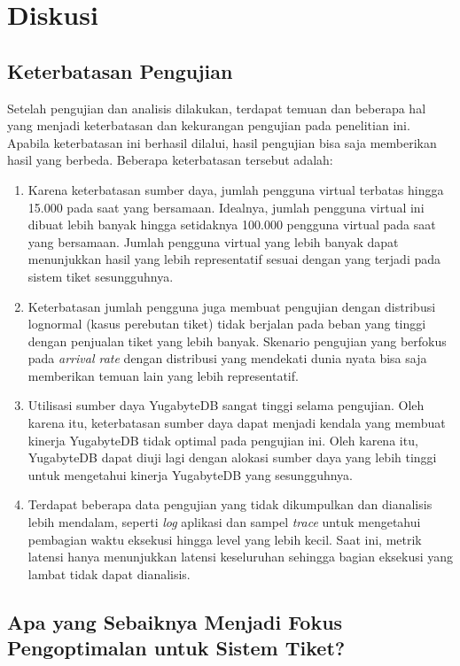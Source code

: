 \section{Diskusi}

\subsection{Keterbatasan Pengujian}
\label{keterbatasan-pengujian}

Setelah pengujian dan analisis dilakukan, terdapat temuan dan beberapa hal yang menjadi keterbatasan dan kekurangan pengujian pada penelitian ini. Apabila keterbatasan ini berhasil dilalui, hasil pengujian bisa saja memberikan hasil yang berbeda. Beberapa keterbatasan tersebut adalah:

\begin{enumerate}
    \item Karena keterbatasan sumber daya, jumlah pengguna virtual terbatas hingga 15.000 pada saat yang bersamaan. Idealnya, jumlah pengguna virtual ini dibuat lebih banyak hingga setidaknya 100.000 pengguna virtual pada saat yang bersamaan. Jumlah pengguna virtual yang lebih banyak dapat menunjukkan hasil yang lebih representatif sesuai dengan yang terjadi pada sistem tiket sesungguhnya.
    \item Keterbatasan jumlah pengguna juga membuat pengujian dengan distribusi lognormal (kasus perebutan tiket) tidak berjalan pada beban yang tinggi dengan penjualan tiket yang lebih banyak. Skenario pengujian yang berfokus pada \textit{arrival rate} dengan distribusi yang mendekati dunia nyata bisa saja memberikan temuan lain yang lebih representatif.
    \item Utilisasi sumber daya YugabyteDB sangat tinggi selama pengujian. Oleh karena itu, keterbatasan sumber daya dapat menjadi kendala yang membuat kinerja YugabyteDB tidak optimal pada pengujian ini. Oleh karena itu, YugabyteDB dapat diuji lagi dengan alokasi sumber daya yang lebih tinggi untuk mengetahui kinerja YugabyteDB yang sesungguhnya.
    \item Terdapat beberapa data pengujian yang tidak dikumpulkan dan dianalisis lebih mendalam, seperti \textit{log} aplikasi dan sampel \textit{trace} untuk mengetahui pembagian waktu eksekusi hingga level yang lebih kecil. Saat ini, metrik latensi hanya menunjukkan latensi keseluruhan sehingga bagian eksekusi yang lambat tidak dapat dianalisis.
\end{enumerate}

\subsection{Apa yang Sebaiknya Menjadi Fokus Pengoptimalan untuk Sistem Tiket?}

